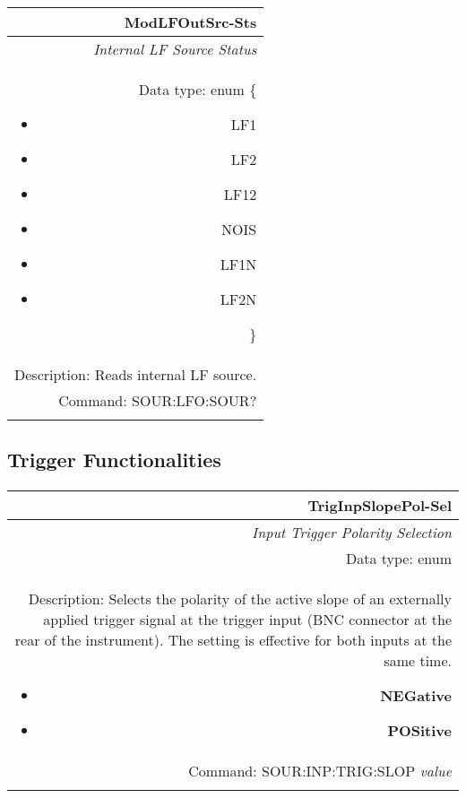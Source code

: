 \documentclass[openany]{article}
\begin{document}
		\begin{tabular}{N}
			\hline
			\bfseries ModLFOutSrc-Sts \\ \hline
			\emph{Internal LF Source Status} \\
			Data type: enum \{\begin{itemize}[noitemsep]
				\small
				\item[] LF1
				\item[] LF2
				\item[] LF12
				\item[] NOIS
				\item[] LF1N
				\item[] LF2N

			\end{itemize}\} \\ 
			Description: Reads internal LF source. \\
			Command: SOUR:LFO:SOUR? \\
			\\

		\end{tabular}



	\subsection{Trigger Functionalities}\label{pvgroup:function} %

		\paragraph{} %


		\begin{tabular}{N}
			\hline
			\bfseries TrigInpSlopePol-Sel \\ \hline
			\emph{Input Trigger Polarity Selection} \\
			Data type: enum \\   
			Description: Selects the polarity of the active slope of an externally applied trigger signal at the trigger input (BNC connector at the rear of the instrument). The setting is effective for both inputs at the same time.\begin{itemize}[noitemsep]
				\small
				\item[] \textbf{NEGative}
                                \item[] \textbf{POSitive}
			\end{itemize} \\
			Command: SOUR:INP:TRIG:SLOP \emph{value} \\
			\\

		\end{tabular}
\end{document}
